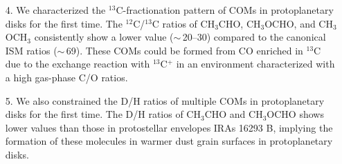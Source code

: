 \documentclass[linenumbers, twocolumn, twocolappendix, astrosymb, times]{aastex631}
\newcommand{\methanol}{CH$_3$OH\xspace}
\newcommand{\acetaldehyde}{CH$_3$CHO\xspace}
\newcommand{\methylformate}{CH$_3$OCHO\xspace}
\newcommand{\dimethylether}{CH$_3$OCH$_3$\xspace}
\begin{document}
\begin{enumerate}
    \item[4.] We characterized the $^{13}$C-fractionation pattern of COMs in protoplanetary disks for the first time. The $^{12}$C/$^{13}$C ratios of \acetaldehyde, \methylformate, and \dimethylether consistently show a lower value ($\sim$\,20--30) compared to the canonical ISM ratios ($\sim$\,69). These COMs could be formed from CO enriched in $^{13}$C due to the exchange reaction with $^{13}$C$^+$ in an environment characterized with a high gas-phase C/O ratios.
    \item[5.]  We also constrained the D/H ratios of multiple COMs in protoplanetary disks for the first time. The D/H ratios of \acetaldehyde and \methylformate shows lower values than those in protostellar envelopes IRAs 16293 B, implying the formation of these molecules in warmer dust grain surfaces in protoplanetary disks. 
\end{enumerate}
\end{document}
